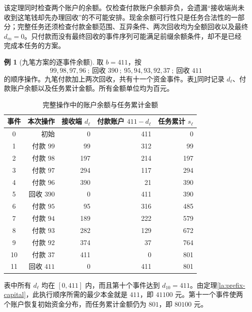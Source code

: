 \documentclass[UTF8,a4paper]{ctexbook}
\theoremstyle{definition}
\newtheorem{example}[theorem]{例}
\numberwithin{equation}{chapter}
\newcommand{\1}{\mathbf{1}}
\begin{document}
该定理同时检查两个账户的余额。仅检查付款账户余额非负，会遗漏“接收端尚未收到这笔钱却先办理回收”的不可能安排。现金余额可行性只是任务合法性的一部分；完整任务还须检查付款金额范围、互异条件、两次回收均为全额回收以及最终 $d_m=0$。只付款而没有最终回收的事件序列可能满足前缀余额条件，却不是已经完成本任务的方案。

\begin{example}[九笔方案的逐事件余额]\label{la:cash-example}
取 $b=411$，按
\[
99,98,97,96\ ;\ \text{回收 }390\ ;\ 95,94,93,92,37\ ;\ \text{回收 }411
\]
的顺序操作。九笔付款加上两次回收，共有十一个资金事件。表\ref{la:cash-table}同时记录 $d_\ell$、付款账户余额以及任务累计金额。所有金额单位均为百元。

\begin{table}[htbp]
\centering
\caption{完整操作中的账户余额与任务累计金额}\label{la:cash-table}
\begin{tabular}{crrrr}
\toprule
事件 & 本次操作 & 接收端 $d_\ell$ & 付款账户 $411-d_\ell$ & 任务累计 $s_\ell$\\
\midrule
0 & 初始 & 0 & 411 & 0\\
1 & 付款 $99$ & 99 & 312 & 99\\
2 & 付款 $98$ & 197 & 214 & 197\\
3 & 付款 $97$ & 294 & 117 & 294\\
4 & 付款 $96$ & 390 & 21 & 390\\
5 & 回收 $390$ & 0 & 411 & 390\\
6 & 付款 $95$ & 95 & 316 & 485\\
7 & 付款 $94$ & 189 & 222 & 579\\
8 & 付款 $93$ & 282 & 129 & 672\\
9 & 付款 $92$ & 374 & 37 & 764\\
10 & 付款 $37$ & 411 & 0 & 801\\
11 & 回收 $411$ & 0 & 411 & 801\\
\bottomrule
\end{tabular}
\end{table}

表中所有 $d_\ell$ 均在 $[0,411]$ 内，而且第十个事件达到 $d_{10}=411$。由定理\ref{la:prefix-capital}，此执行顺序所需的最少本金就是 $411$，即 $41100$ 元。第十一个事件使两个账户恢复初始资金分布，而任务累计金额仍为 $801$，即 $80100$ 元。
\end{example}
\end{document}
